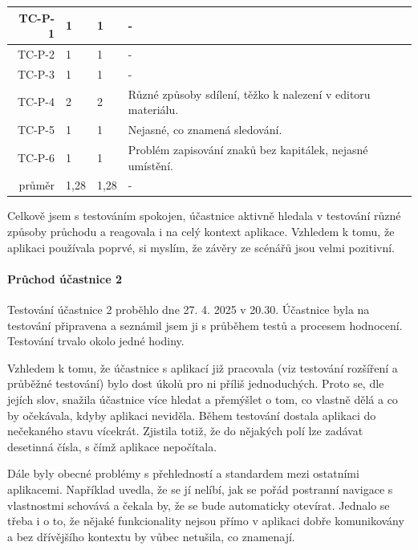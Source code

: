 \begin{longtable}{r|p{2cm}|p{2cm}|p{6cm}}
TC-P-1   & 1 & 1 & - \\\hline
TC-P-2   & 1 & 1 & - \\\hline
TC-P-3   & 1 & 1 & - \\\hline
TC-P-4   & 2 & 2 & Různé způsoby sdílení, těžko k nalezení v editoru materiálu. \\\hline
TC-P-5   & 1 & 1 & Nejasné, co znamená sledování. \\\hline
TC-P-6   & 1 & 1 & Problém zapisování znaků bez kapitálek, nejasné umístění. \\\hline\hline
průměr   & 1,28 & 1,28 & - \\
\end{longtable}

Celkově jsem s testováním spokojen, účastnice aktivně hledala v testování různé způsoby průchodu a reagovala i na celý kontext aplikace.
Vzhledem k tomu, že aplikaci používala poprvé, si myslím, že závěry ze scénářů jsou velmi pozitivní.




\paragraph{Průchod účastnice 2}

Testování účastnice 2 proběhlo dne 27. 4. 2025 v 20.30. 
Účastnice byla na testování připravena a seznámil jsem ji s průběhem testů a procesem hodnocení. 
Testování trvalo okolo jedné hodiny.

Vzhledem k tomu, že účastnice s aplikací již pracovala (viz testování rozšíření a průběžné testování) bylo dost úkolů pro ni příliš jednoduchých. 
Proto se, dle jejích slov, snažila účastnice více hledat a přemýšlet o tom, co vlastně dělá a co by očekávala, kdyby aplikaci neviděla.
Během testování dostala aplikaci do nečekaného stavu vícekrát.
Zjistila totiž, že do nějakých polí lze zadávat desetinná čísla, s čímž aplikace nepočítala.

Dále byly obecné problémy s přehledností a standardem mezi ostatními aplikacemi.
Například uvedla, že se jí nelíbí, jak se pořád postranní navigace s vlastnostmi schovává a čekala by, že se bude automaticky otevírat. 
Jednalo se třeba i o to, že nějaké funkcionality nejsou přímo v aplikaci dobře komunikovány a bez dřívějšího kontextu by vůbec netušila, co znamenají.

